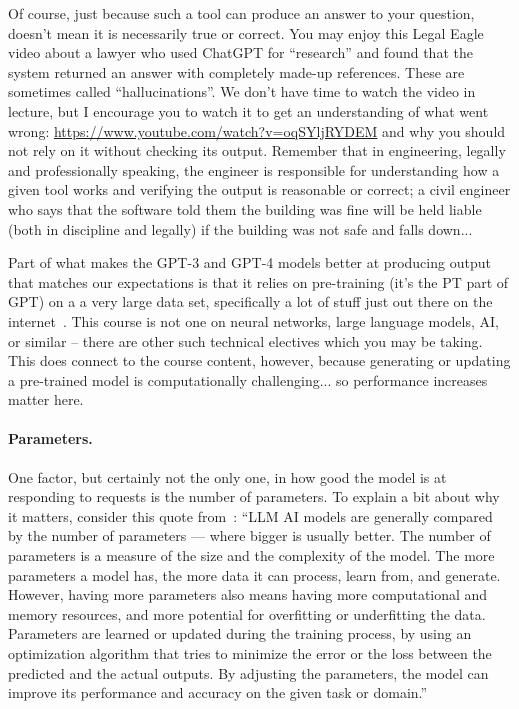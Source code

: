 Of course, just because such a tool can produce an answer to your question, doesn't mean it is necessarily true or correct. You may enjoy this Legal Eagle video about a lawyer who used ChatGPT for ``research'' and found that the system returned an answer with completely made-up references. These are sometimes called ``hallucinations''. We don't have time to watch the video in lecture, but I encourage you to watch it to get an understanding of what went wrong: \url{https://www.youtube.com/watch?v=oqSYljRYDEM} and why you should not rely on it without checking its output. Remember that in engineering, legally and professionally speaking, the engineer is responsible for understanding how a given tool works and verifying the output is reasonable or correct; a civil engineer who says that the software told them the building was fine will be held liable (both in discipline and legally) if the building was not safe and falls down...

Part of what makes the GPT-3 and GPT-4 models better at producing output that matches our expectations is that it relies on pre-training (it's the PT part of GPT) on a a very large data set, specifically a lot of stuff just out there on the internet~\cite{gptforgood}. This course is not one on neural networks, large language models, AI, or similar -- there are other such technical electives which you may be taking. This does connect to the course content, however, because generating or updating a pre-trained model is computationally challenging... so performance increases matter here.

\paragraph{Parameters.} One factor, but certainly not the only one, in how good the model is at responding to requests is the number of parameters. To explain a bit about why it matters, consider this quote from~\cite{msllm}: ``LLM AI models are generally compared by the number of parameters — where bigger is usually better. The number of parameters is a measure of the size and the complexity of the model. The more parameters a model has, the more data it can process, learn from, and generate. However, having more parameters also means having more computational and memory resources, and more potential for overfitting or underfitting the data. Parameters are learned or updated during the training process, by using an optimization algorithm that tries to minimize the error or the loss between the predicted and the actual outputs. By adjusting the parameters, the model can improve its performance and accuracy on the given task or domain.''

